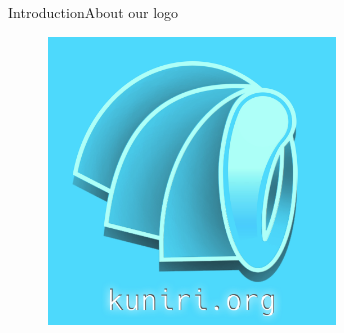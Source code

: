 \documentclass[10pt]{beamer}
\begin{document}
\begin{frame}{Introduction}{About our logo}
  \begin{figure}[overview]
    \includegraphics[width=0.68\textwidth]{images/2.jpg}
  \end{figure}
\end{frame}
\end{document}
